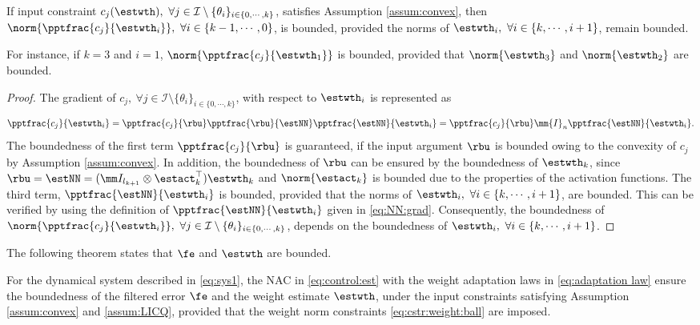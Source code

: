 \documentclass[letterpaper, journal]{IEEEtran}
\begin{document}
\begin{lem} 
    If input constraint $c_j(\estwth),\ \forall j\in\mathcal I \setminus \{\theta_i\}_{i\in\{0,\cdots,k\}}$, satisfies Assumption \ref{assum:convex}, then $\norm{\pptfrac{c_j}{\estwth_i}},\ \forall i\in\{k-1,\cdots, 0\}$, is bounded, provided the norms of $\estwth_i,\ \forall i\in\{k,\cdots, i+1\}$, remain bounded.
    \label{lem:cstr:grad:bound}
\end{lem}

For instance, if $k=3$ and $i=1$, $\norm{\pptfrac{c_j}{\estwth_1}}$ is bounded, provided that $\norm{\estwth_3}$ and $\norm{\estwth_2}$ are bounded.

\begin{proof}

The gradient of $c_j,\ \forall j\in\mathcal I \setminus \{\theta_i\}_{i\in\{0,\cdots,k\}}$, with respect to $\estwth_i$ is represented as
\begin{equation}
    \pptfrac{c_j}{\estwth_i} 
    = 
    \pptfrac{c_j}{\rbu} 
    \pptfrac{\rbu}{\estNN} 
    \pptfrac{\estNN}{\estwth_i}
    = 
    \pptfrac{c_j}{\rbu} 
    \mm{I}_n
    \pptfrac{\estNN}{\estwth_i}
    .
\end{equation}
The boundedness of the first term $\pptfrac{c_j}{\rbu}$ is guaranteed, if the input argument $\rbu$ is bounded owing to the convexity of $c_j$ by Assumption \ref{assum:convex}.
In addition, the boundedness of $\rbu$ can be ensured by the boundedness of $\estwth_k$, since $\rbu=\estNN=(\mm I_{l_{k+1}}\otimes \estact_k^\top)\estwth_k$ and $\norm{\estact_k}$ is bounded due to the properties of the activation functions.
The third term, $\pptfrac{\estNN}{\estwth_i}$ is bounded, provided that the norms of $\estwth_i,\ \forall i \in\{k,\cdots,i+1\}$, are bounded. 
This can be verified by using the definition of $\pptfrac{\estNN}{\estwth_i}$ given in \eqref{eq:NN:grad}.
Consequently, the boundedness of $\norm{\pptfrac{c_j}{\estwth_i}},\ \forall j\in\mathcal I \setminus \{\theta_i\}_{i\in\{0,\cdots,k\}}$, depends on the boundedness of $\estwth_i,\ \forall i\in \{k,\cdots,i+1\}$.

\end{proof}

The following theorem states that $\fe$ and $\estwth$ are bounded.

\begin{theorem}
    For the dynamical system described in \eqref{eq:sys1}, the NAC in \eqref{eq:control:est} with the weight adaptation laws in \eqref{eq:adaptation law} ensure the boundedness of the filtered error $\fe$ and the weight estimate $\estwth$, under the input constraints satisfying Assumption \ref{assum:convex} and \ref{assum:LICQ}, provided that the weight norm constraints \eqref{eq:cstr:weight:ball} are imposed.
\end{theorem}
\end{document}
